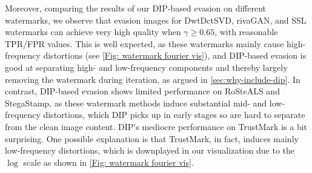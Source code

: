 Moreover, comparing the results of our DIP-based evasion on different watermarks, we observe that evasion images for DwtDctSVD, rivaGAN, and SSL watermarks can achieve very high quality when $\gamma \ge 0.65$, with reasonable TPR/FPR values. This is well expected, as these watermarks mainly cause high-frequency distortions  (see \cref{Fig: watermark fourier vis}), and DIP-based evasion is good at separating high- and low-frequency components and thereby largely removing the watermark during iteration, as argued in \cref{sec:why-include-dip}. In contrast,  DIP-based evasion shows limited performance on RoSteALS and StegaStamp, as these watermark methods induce substantial mid- and low-frequency distortions, which DIP picks up in early stages so are hard to separate from the clean image content. DIP's mediocre performance on TrustMark is a bit surprising. One possible explanation is that TrustMark, in fact, induces mainly low-frequency distortions, which is downplayed in our visualization due to the $\log$ scale  as shown in \cref{Fig: watermark fourier vis}. 
 





